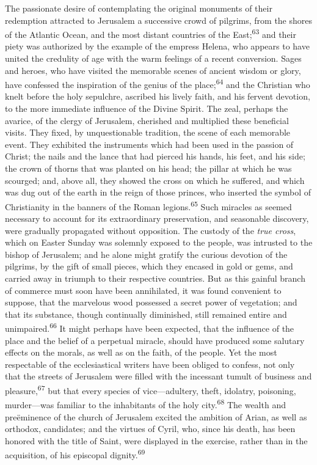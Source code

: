 The passionate desire of contemplating the original monuments of
their redemption attracted to Jerusalem a successive crowd of
pilgrims, from the shores of the Atlantic Ocean, and the most
distant countries of the East;\textsuperscript{63} and their piety was authorized
by the example of the empress Helena, who appears to have united
the credulity of age with the warm feelings of a recent
conversion. Sages and heroes, who have visited the memorable
scenes of ancient wisdom or glory, have confessed the inspiration
of the genius of the place;\textsuperscript{64} and the Christian who knelt before
the holy sepulchre, ascribed his lively faith, and his fervent
devotion, to the more immediate influence of the Divine Spirit.
The zeal, perhaps the avarice, of the clergy of Jerusalem,
cherished and multiplied these beneficial visits. They fixed, by
unquestionable tradition, the scene of each memorable event. They
exhibited the instruments which had been used in the passion of
Christ; the nails and the lance that had pierced his hands, his
feet, and his side; the crown of thorns that was planted on his
head; the pillar at which he was scourged; and, above all, they
showed the cross on which he suffered, and which was dug out of
the earth in the reign of those princes, who inserted the symbol
of Christianity in the banners of the Roman legions.\textsuperscript{65} Such
miracles as seemed necessary to account for its extraordinary
preservation, and seasonable discovery, were gradually propagated
without opposition. The custody of the \textit{true cross}, which on
Easter Sunday was solemnly exposed to the people, was intrusted
to the bishop of Jerusalem; and he alone might gratify the
curious devotion of the pilgrims, by the gift of small pieces,
which they encased in gold or gems, and carried away in triumph
to their respective countries. But as this gainful branch of
commerce must soon have been annihilated, it was found convenient
to suppose, that the marvelous wood possessed a secret power of
vegetation; and that its substance, though continually
diminished, still remained entire and unimpaired.\textsuperscript{66} It might
perhaps have been expected, that the influence of the place and
the belief of a perpetual miracle, should have produced some
salutary effects on the morals, as well as on the faith, of the
people. Yet the most respectable of the ecclesiastical writers
have been obliged to confess, not only that the streets of
Jerusalem were filled with the incessant tumult of business and
pleasure,\textsuperscript{67} but that every species of vice—adultery, theft,
idolatry, poisoning, murder—was familiar to the inhabitants of
the holy city.\textsuperscript{68} The wealth and preëminence of the church of
Jerusalem excited the ambition of Arian, as well as orthodox,
candidates; and the virtues of Cyril, who, since his death, has
been honored with the title of Saint, were displayed in the
exercise, rather than in the acquisition, of his episcopal
dignity.\textsuperscript{69}

